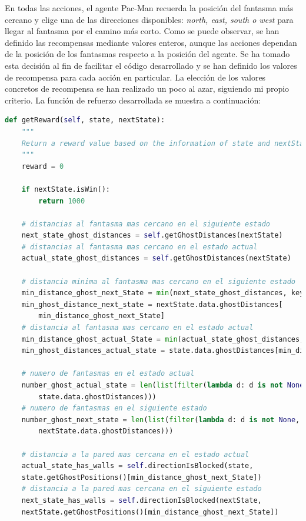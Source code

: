 \documentclass[11pt]{exam}
\begin{document}
En todas las acciones, el agente Pac-Man recuerda la posición del fantasma más cercano y elige una de las direcciones disponibles: \textit{north, east, south o west} para llegar al fantasma por el camino más corto. Como se puede observar, se han definido las recompensas mediante valores enteros, aunque las acciones dependan de la posición de los fantasmas respecto a la posición del agente. Se ha tomado esta decisión al fin de facilitar el código desarrollado y se han definido los valores de recompensa para cada acción en particular. La elección de los valores concretos de recompensa se han realizado un poco al azar, siguiendo mi propio criterio. La función de refuerzo desarrollada se muestra a continuación:
\vspace*{3mm}

\begin{lstlisting}[caption={Función de refuerzo.}, label={reward}, language=python, basicstyle=\scriptsize]
def getReward(self, state, nextState):
	"""
	Return a reward value based on the information of state and nextState
	"""
	reward = 0
	
	if nextState.isWin():
		return 1000
	
	# distancias al fantasma mas cercano en el siguiente estado
	next_state_ghost_distances = self.getGhostDistances(nextState)
	# distancias al fantasma mas cercano en el estado actual
	actual_state_ghost_distances = self.getGhostDistances(nextState)
	
	# distancia minima al fantasma mas cercano en el siguiente estado
	min_distance_ghost_next_State = min(next_state_ghost_distances, key=lambda t: t[1])[0]
	min_ghost_distance_next_state = nextState.data.ghostDistances[
		min_distance_ghost_next_State]
	# distancia al fantasma mas cercano en el estado actual
	min_distance_ghost_actual_State = min(actual_state_ghost_distances, key=lambda t: t[1])[0]
	min_ghost_distances_actual_state = state.data.ghostDistances[min_distance_ghost_actual_State]
	
	# numero de fantasmas en el estado actual
	number_ghost_actual_state = len(list(filter(lambda d: d is not None, 
		state.data.ghostDistances)))
	# numero de fantasmas en el siguiente estado
	number_ghost_next_state = len(list(filter(lambda d: d is not None, 
		nextState.data.ghostDistances)))
	
	# distancia a la pared mas cercana en el estado actual
	actual_state_has_walls = self.directionIsBlocked(state,
	state.getGhostPositions()[min_distance_ghost_next_State])
	# distancia a la pared mas cercana en el siguiente estado
	next_state_has_walls = self.directionIsBlocked(nextState,
	nextState.getGhostPositions()[min_distance_ghost_next_State])
	

\end{lstlisting}
\end{document}
